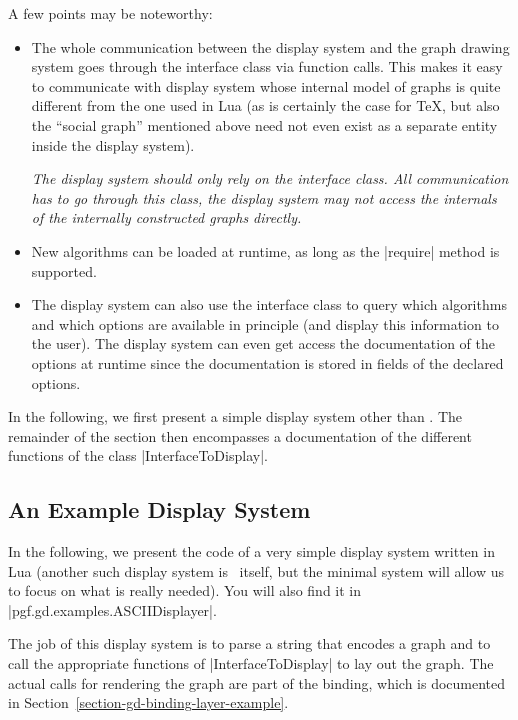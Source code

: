 A few points may be noteworthy:
%
\begin{itemize}
    \item The whole communication between the display system and the graph
        drawing system goes through the interface class via function calls.
        This makes it easy to communicate with display system whose internal
        model of graphs is quite different from the one used in Lua (as is
        certainly the case for \TeX, but also the ``social graph'' mentioned
        above need not even exist as a separate entity inside the display
        system).

        \emph{The display system should only rely on the interface class. All
        communication has to go through this class, the display system may not
        access the internals of the internally constructed graphs directly.}
    \item New algorithms can be loaded at runtime, as long as the |require|
        method is supported.
    \item The display system can also use the interface class to query which
        algorithms and which options are available in principle (and display
        this information to the user). The display system can even get access
        the documentation of the options at runtime since the documentation is
        stored in fields of the declared options.
\end{itemize}

In the following, we first present a simple display system other than
\tikzname. The remainder of the section then encompasses a documentation of the
different functions of the class |InterfaceToDisplay|.


\subsection{An Example Display System}

In the following, we present the code of a very simple display system written
in Lua (another such display system is \tikzname\ itself, but the minimal
system will allow us to focus on what is really needed). You will also find it
in |pgf.gd.examples.ASCIIDisplayer|.

The job of this display system is to parse a string that encodes a graph and to
call the appropriate functions of |InterfaceToDisplay| to lay out the graph.
The actual calls for rendering the graph are part of the binding, which is
documented in Section~\ref{section-gd-binding-layer-example}.

